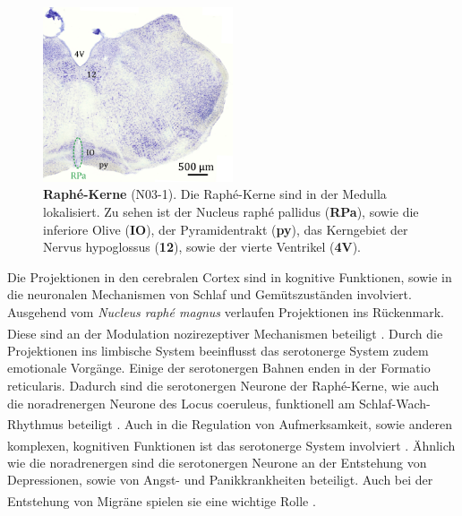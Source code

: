 \documentclass[12pt,a4paper,pdftex]{article}
\begin{document}
\begin{figure}[H]
    \centering
    \includegraphics[width=0.5\textwidth]{pictures/Bilder_monoamine_systeme/raphe_nuclei.png}
    \caption[Raphé-Kerne]{\textbf{Raphé-Kerne} (N03-1). Die Raphé-Kerne sind in der Medulla lokalisiert. Zu sehen ist der Nucleus raphé pallidus (\textbf{RPa}), sowie die inferiore Olive (\textbf{IO}), der Pyramidentrakt (\textbf{py}), das Kerngebiet der Nervus hypoglossus (\textbf{12}), sowie der vierte Ventrikel (\textbf{4V}).}
    \label{fig:raphe_nuclei}
\end{figure}

Die Projektionen in den cerebralen Cortex sind in kognitive Funktionen, sowie in die neuronalen Mechanismen von Schlaf und  Gemütszuständen involviert. Ausgehend vom \textit{Nucleus raphé magnus} verlaufen Projektionen ins Rückenmark. Diese sind an der Modulation nozirezeptiver Mechanismen beteiligt \textsuperscript{\cite[9]{crossman2014neuroanatomy}}. Durch die Projektionen ins limbische System beeinflusst das serotonerge System zudem emotionale Vorgänge. Einige der serotonergen Bahnen enden in der Formatio reticularis. Dadurch sind die serotonergen Neurone der Raphé-Kerne, wie auch die noradrenergen Neurone des Locus coeruleus, funktionell am Schlaf-Wach-Rhythmus beteiligt \textsuperscript{\cite[6]{trepel2011neuroanatomie}}. Auch in die Regulation von Aufmerksamkeit, sowie anderen komplexen, kognitiven Funktionen ist das serotonerge System involviert \textsuperscript{\cite[46]{kandel2013principles}}. Ähnlich wie die noradrenergen sind die serotonergen Neurone an der Entstehung von Depressionen, sowie von Angst- und Panikkrankheiten beteiligt. Auch bei der Entstehung von Migräne spielen sie eine wichtige Rolle \textsuperscript{\cite[6]{trepel2011neuroanatomie}}.
\end{document}
